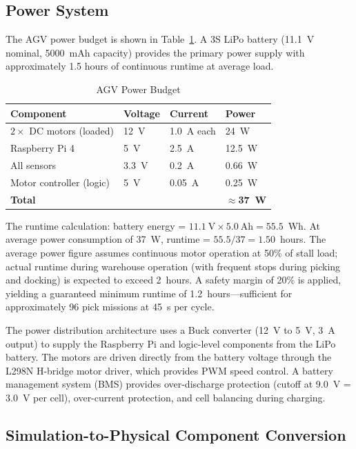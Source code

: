 \documentclass[12pt,a4paper,oneside]{report}
\begin{document}
\subsection{Power System}

The AGV power budget is shown in Table~\ref{tab:power}. A 3S LiPo battery (11.1~V nominal, 5000~mAh capacity) provides the primary power supply with approximately 1.5 hours of continuous runtime at average load.

\begin{table}[H]
\centering
\caption{AGV Power Budget}
\label{tab:power}
\begin{tabular}{p{5cm} p{2cm} p{2cm} p{2cm}}
\toprule
\textbf{Component} & \textbf{Voltage} & \textbf{Current} & \textbf{Power} \\
\midrule
$2\times$ DC motors (loaded) & 12~V & 1.0~A each & 24~W \\
Raspberry Pi 4 & 5~V & 2.5~A & 12.5~W \\
All sensors & 3.3~V & 0.2~A & 0.66~W \\
Motor controller (logic) & 5~V & 0.05~A & 0.25~W \\
\midrule
\textbf{Total} & & & $\approx$\textbf{37~W} \\
\bottomrule
\end{tabular}
\end{table}

The runtime calculation: battery energy = $11.1~\text{V} \times 5.0~\text{Ah} = 55.5$~Wh. At average power consumption of 37~W, runtime = $55.5/37 = 1.50$~hours. The average power figure assumes continuous motor operation at 50\% of stall load; actual runtime during warehouse operation (with frequent stops during picking and docking) is expected to exceed 2~hours. A safety margin of 20\% is applied, yielding a guaranteed minimum runtime of 1.2~hours---sufficient for approximately 96 pick missions at 45~s per cycle.

The power distribution architecture uses a Buck converter (12~V to 5~V, 3~A output) to supply the Raspberry Pi and logic-level components from the LiPo battery. The motors are driven directly from the battery voltage through the L298N H-bridge motor driver, which provides PWM speed control. A battery management system (BMS) provides over-discharge protection (cutoff at 9.0~V = 3.0~V per cell), over-current protection, and cell balancing during charging.

\subsection{Simulation-to-Physical Component Conversion}
\end{document}
